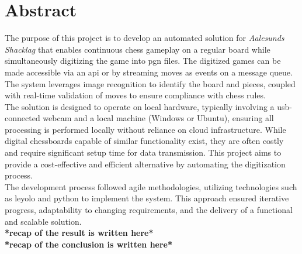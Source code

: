 \chapter*{Abstract}


The purpose of this project is to develop an automated solution for \textit{Aalesunds Shacklag} that enables continuous chess gameplay on a regular board while simultaneously digitizing the game into \gls{pgn} files. The digitized games can be made accessible via an \gls{api} or by streaming moves as events on a message queue. The system leverages image recognition to identify the board and pieces, coupled with real-time validation of moves to ensure compliance with chess rules.\\

The solution is designed to operate on local hardware, typically involving a \acrshort{usb}-connected webcam and a local machine (Windows or Ubuntu), ensuring all processing is performed locally without reliance on cloud infrastructure. While digital chessboards capable of similar functionality exist, they are often costly and require significant setup time for data transmission. This project aims to provide a cost-effective and efficient alternative by automating the digitization process.\\

The development process followed \gls{agile} methodologies, utilizing technologies such as \gls{leyolo} and \gls{python} to implement the system. This approach ensured iterative progress, adaptability to changing requirements, and the delivery of a functional and scalable solution.\\

\textbf{*recap of the result is written here*}\\

\textbf{*recap of the conclusion is written here*}